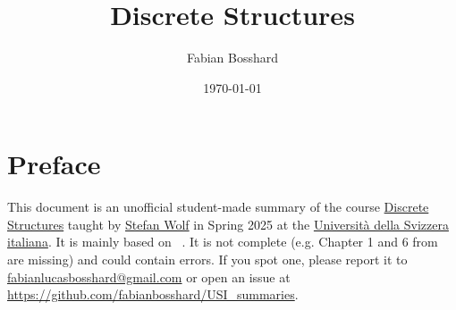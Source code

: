 
\usepackage{caption, subcaption}

\usepackage[backend=biber,style=numeric]{biblatex}



\usepackage[
  colorlinks=false,        %
  pdfborder={0 0 0}        %
]{hyperref}
\usepackage[
  type     = {CC},
  modifier = {by},
  version  = {4.0},
]{doclicense}
\usepackage{cleveref}







\title{Discrete Structures}
\author{Fabian Bosshard}
\date{\today}






\pagestyle{plain}


\maketitle


\tableofcontents







\section*{Preface}

This document is an unofficial student-made summary of the course 
\href{https://search.usi.ch/courses/35270737/discrete-structures}{Discrete Structures} taught by \href{https://search.usi.ch/people/eefbe656c9dfacf0e1a1e15bf8893bcb/wolf-stefan}{Stefan Wolf} in Spring 2025 at the 
\href{https://www.usi.ch/it}{Università della Svizzera italiana}.
It is mainly based on ~\cite{boschini2022}.
It is not complete (e.g. Chapter 1 and 6 from \cite{boschini2022} are missing) and could contain errors.
If you spot one, please report it to \href{mailto:fabianlucasbosshard@gmail.com}{fabianlucasbosshard@gmail.com} or open an issue at \url{https://github.com/fabianbosshard/USI_summaries}.



